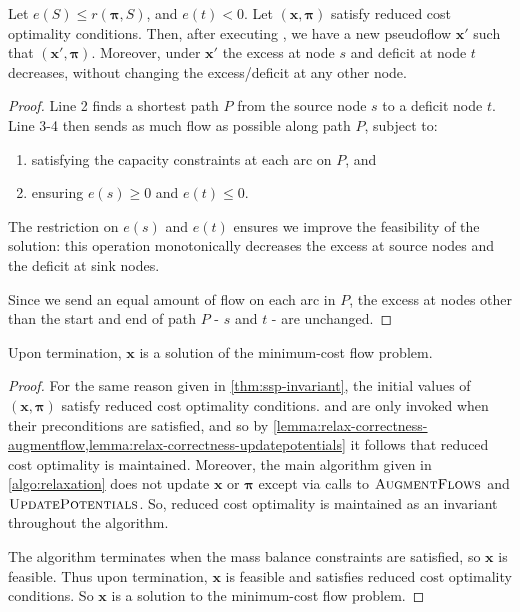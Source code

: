 \begin{lemma} \label{lemma:relax-correctness-augmentflow}
Let $e(S) \leq r(\boldsymbol{\pi},S)$, and $e(t) < 0$. Let $\left(\mathbf{x},\boldsymbol{\pi}\right)$ satisfy reduced cost optimality conditions. Then, after executing , we have a new pseudoflow $\mathbf{x}'$ such that $\left(\mathbf{x}',\boldsymbol{\pi}\right)$. Moreover, under $\mathbf{x}'$ the excess at node $s$ and deficit at node $t$ decreases, without changing the excess/deficit at any other node\footnotemark.
\end{lemma}
\begin{proof}
Line 2 finds a shortest path $P$ from the source node $s$ to a deficit node $t$. Line 3-4 then sends as much flow as possible along path $P$, subject to:
\begin{enumerate}
    \item satisfying the capacity constraints at each arc on $P$, and
    \item ensuring $e(s) \geq 0$ and $e(t) \leq 0$.
\end{enumerate}
The restriction on $e(s)$ and $e(t)$ ensures we improve the feasibility of the solution: this operation monotonically decreases the excess at source nodes and the deficit at sink nodes\footnotemark.

Since we send an equal amount of flow on each arc in $P$, the excess at nodes other than the start and end of path $P$ - $s$ and $t$ - are unchanged.
\end{proof}

\begin{thm}[Correctness] \label{thm:relax-correctness}
Upon termination, $\mathbf{x}$ is a solution of the minimum-cost flow problem.
\end{thm}
\begin{proof}
For the same reason given in \cref{thm:ssp-invariant}, the initial values of $\left(\mathbf{x},\boldsymbol{\pi}\right)$ satisfy reduced cost optimality conditions.  and  are only invoked when their preconditions are satisfied, and so by \cref{lemma:relax-correctness-augmentflow,lemma:relax-correctness-updatepotentials} it follows that reduced cost optimality is maintained. Moreover, the main algorithm given in \cref{algo:relaxation} does not update $\mathbf{x}$ or $\boldsymbol{\pi}$ except via calls to $\textproc{AugmentFlows}$ and $\textproc{UpdatePotentials}$. So, reduced cost optimality is maintained as an invariant throughout the algorithm.

The algorithm terminates when the mass balance constraints are satisfied, so $\mathbf{x}$ is feasible. Thus upon termination, $\mathbf{x}$ is feasible and satisfies reduced cost optimality conditions. So $\mathbf{x}$ is a solution to the minimum-cost flow problem. 
\end{proof}

